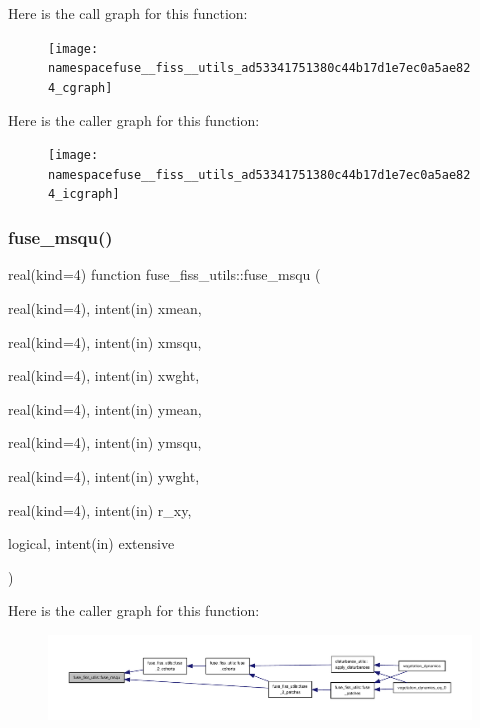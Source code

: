 Here is the call graph for this function\+:
\nopagebreak
\begin{figure}[H]
\begin{center}
\leavevmode
\texttt{[image: namespacefuse\_\_fiss\_\_utils\_ad53341751380c44b17d1e7ec0a5ae824\_cgraph]}
\end{center}
\end{figure}
Here is the caller graph for this function\+:
\nopagebreak
\begin{figure}[H]
\begin{center}
\leavevmode
\texttt{[image: namespacefuse\_\_fiss\_\_utils\_ad53341751380c44b17d1e7ec0a5ae824\_icgraph]}
\end{center}
\end{figure}
\mbox{\label{namespacefuse__fiss__utils_aae52213c98fe3ffb3ecde24d8ffc6e03}} 
\subsubsection{\texorpdfstring{fuse\+\_\+msqu()}{fuse\_msqu()}}
{\footnotesize\ttfamily real(kind=4) function fuse\+\_\+fiss\+\_\+utils\+::fuse\+\_\+msqu (\begin{DoxyParamCaption}\item[{real(kind=4), intent(in)}]{xmean,  }\item[{real(kind=4), intent(in)}]{xmsqu,  }\item[{real(kind=4), intent(in)}]{xwght,  }\item[{real(kind=4), intent(in)}]{ymean,  }\item[{real(kind=4), intent(in)}]{ymsqu,  }\item[{real(kind=4), intent(in)}]{ywght,  }\item[{real(kind=4), intent(in)}]{r\+\_\+xy,  }\item[{logical, intent(in)}]{extensive }\end{DoxyParamCaption})}

Here is the caller graph for this function\+:
\nopagebreak
\begin{figure}[H]
\begin{center}
\leavevmode
\includegraphics[width=350pt]{namespacefuse__fiss__utils_aae52213c98fe3ffb3ecde24d8ffc6e03_icgraph}
\end{center}
\end{figure}
\mbox{\label{namespacefuse__fiss__utils_aee30640ff825246fb4c9f5f1f41470be}} 
